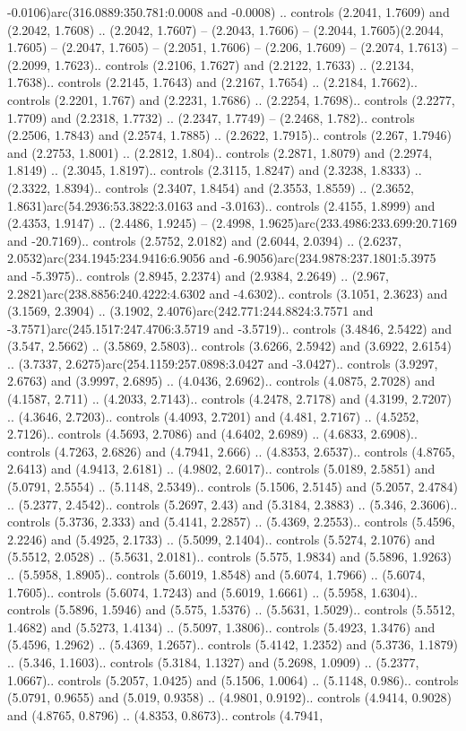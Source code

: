 -0.0106)arc(316.0889:350.781:0.0008 and -0.0008) .. controls (2.2041, 1.7609) and (2.2042, 1.7608) .. (2.2042, 1.7607) -- (2.2043, 1.7606) -- (2.2044, 1.7605)(2.2044, 1.7605) -- (2.2047, 1.7605) -- (2.2051, 1.7606) -- (2.206, 1.7609) -- (2.2074, 1.7613) -- (2.2099, 1.7623).. controls (2.2106, 1.7627) and (2.2122, 1.7633) .. (2.2134, 1.7638).. controls (2.2145, 1.7643) and (2.2167, 1.7654) .. (2.2184, 1.7662).. controls (2.2201, 1.767) and (2.2231, 1.7686) .. (2.2254, 1.7698).. controls (2.2277, 1.7709) and (2.2318, 1.7732) .. (2.2347, 1.7749) -- (2.2468, 1.782).. controls (2.2506, 1.7843) and (2.2574, 1.7885) .. (2.2622, 1.7915).. controls (2.267, 1.7946) and (2.2753, 1.8001) .. (2.2812, 1.804).. controls (2.2871, 1.8079) and (2.2974, 1.8149) .. (2.3045, 1.8197).. controls (2.3115, 1.8247) and (2.3238, 1.8333) .. (2.3322, 1.8394).. controls (2.3407, 1.8454) and (2.3553, 1.8559) .. (2.3652, 1.8631)arc(54.2936:53.3822:3.0163 and -3.0163).. controls (2.4155, 1.8999) and (2.4353, 1.9147) .. (2.4486, 1.9245) -- (2.4998, 1.9625)arc(233.4986:233.699:20.7169 and -20.7169).. controls (2.5752, 2.0182) and (2.6044, 2.0394) .. (2.6237, 2.0532)arc(234.1945:234.9416:6.9056 and -6.9056)arc(234.9878:237.1801:5.3975 and -5.3975).. controls (2.8945, 2.2374) and (2.9384, 2.2649) .. (2.967, 2.2821)arc(238.8856:240.4222:4.6302 and -4.6302).. controls (3.1051, 2.3623) and (3.1569, 2.3904) .. (3.1902, 2.4076)arc(242.771:244.8824:3.7571 and -3.7571)arc(245.1517:247.4706:3.5719 and -3.5719).. controls (3.4846, 2.5422) and (3.547, 2.5662) .. (3.5869, 2.5803).. controls (3.6266, 2.5942) and (3.6922, 2.6154) .. (3.7337, 2.6275)arc(254.1159:257.0898:3.0427 and -3.0427).. controls (3.9297, 2.6763) and (3.9997, 2.6895) .. (4.0436, 2.6962).. controls (4.0875, 2.7028) and (4.1587, 2.711) .. (4.2033, 2.7143).. controls (4.2478, 2.7178) and (4.3199, 2.7207) .. (4.3646, 2.7203).. controls (4.4093, 2.7201) and (4.481, 2.7167) .. (4.5252, 2.7126).. controls (4.5693, 2.7086) and (4.6402, 2.6989) .. (4.6833, 2.6908).. controls (4.7263, 2.6826) and (4.7941, 2.666) .. (4.8353, 2.6537).. controls (4.8765, 2.6413) and (4.9413, 2.6181) .. (4.9802, 2.6017).. controls (5.0189, 2.5851) and (5.0791, 2.5554) .. (5.1148, 2.5349).. controls (5.1506, 2.5145) and (5.2057, 2.4784) .. (5.2377, 2.4542).. controls (5.2697, 2.43) and (5.3184, 2.3883) .. (5.346, 2.3606).. controls (5.3736, 2.333) and (5.4141, 2.2857) .. (5.4369, 2.2553).. controls (5.4596, 2.2246) and (5.4925, 2.1733) .. (5.5099, 2.1404).. controls (5.5274, 2.1076) and (5.5512, 2.0528) .. (5.5631, 2.0181).. controls (5.575, 1.9834) and (5.5896, 1.9263) .. (5.5958, 1.8905).. controls (5.6019, 1.8548) and (5.6074, 1.7966) .. (5.6074, 1.7605).. controls (5.6074, 1.7243) and (5.6019, 1.6661) .. (5.5958, 1.6304).. controls (5.5896, 1.5946) and (5.575, 1.5376) .. (5.5631, 1.5029).. controls (5.5512, 1.4682) and (5.5273, 1.4134) .. (5.5097, 1.3806).. controls (5.4923, 1.3476) and (5.4596, 1.2962) .. (5.4369, 1.2657).. controls (5.4142, 1.2352) and (5.3736, 1.1879) .. (5.346, 1.1603).. controls (5.3184, 1.1327) and (5.2698, 1.0909) .. (5.2377, 1.0667).. controls (5.2057, 1.0425) and (5.1506, 1.0064) .. (5.1148, 0.986).. controls (5.0791, 0.9655) and (5.019, 0.9358) .. (4.9801, 0.9192).. controls (4.9414, 0.9028) and (4.8765, 0.8796) .. (4.8353, 0.8673).. controls (4.7941, 